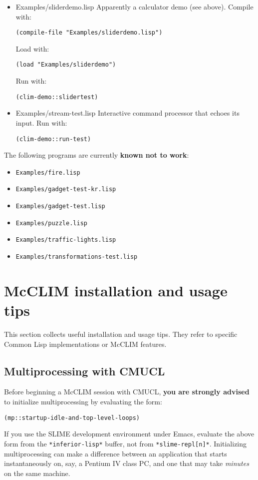 \begin{itemize}
\item Examples/sliderdemo.lisp
Apparently a calculator demo (see above).  Compile with:
\begin{verbatim}
(compile-file "Examples/sliderdemo.lisp")
\end{verbatim}
Load with:
\begin{verbatim}
(load "Examples/sliderdemo")
\end{verbatim}
Run with:
\begin{verbatim}
(clim-demo::slidertest)
\end{verbatim}
\item Examples/stream-test.lisp
Interactive command processor that echoes its input.  Run with:
\begin{verbatim}
(clim-demo::run-test)
\end{verbatim}
\end{itemize}

The following programs are currently \textbf{known not to work}:
\begin{itemize}
\item
 \texttt{Examples/fire.lisp}
\item
 \texttt{Examples/gadget-test-kr.lisp}
\item
 \texttt{Examples/gadget-test.lisp}
\item
 \texttt{Examples/puzzle.lisp}
\item
 \texttt{Examples/traffic-lights.lisp}
\item
 \texttt{Examples/transformations-test.lisp}
\end{itemize}

\section{McCLIM installation and usage tips}

This section collects useful installation and usage tips.  They refer to
specific Common Lisp implementations or McCLIM features.

\subsection{Multiprocessing with CMUCL}

Before beginning a McCLIM session with CMUCL, \textbf{you are strongly
advised} to initialize multiprocessing by evaluating the form:
\begin{verbatim}
(mp::startup-idle-and-top-level-loops)
\end{verbatim}
If you use the SLIME development environment under Emacs, evaluate the
above form from the \texttt{*inferior-lisp*} buffer, not from
\texttt{*slime-repl[n]*}.  Initializing multiprocessing can make a difference
between an application that starts instantaneously on, say, a Pentium IV
class PC, and one that may take \emph{minutes} on the same machine.


